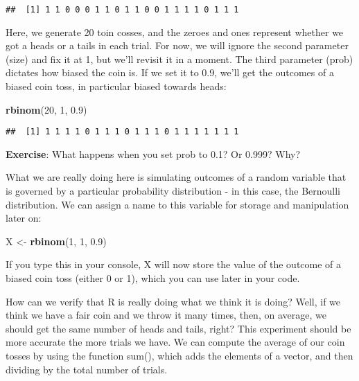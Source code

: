 \documentclass[
]{book}
\newenvironment{Shaded}{\begin{snugshade}}{\end{snugshade}}
\newcommand{\DecValTok}[1]{\textcolor[rgb]{0.00,0.00,0.81}{#1}}
\newcommand{\FloatTok}[1]{\textcolor[rgb]{0.00,0.00,0.81}{#1}}
\newcommand{\KeywordTok}[1]{\textcolor[rgb]{0.13,0.29,0.53}{\textbf{#1}}}
\newcommand{\NormalTok}[1]{#1}
\newcommand{\StringTok}[1]{\textcolor[rgb]{0.31,0.60,0.02}{#1}}
\begin{document}
\begin{verbatim}
##  [1] 1 1 0 0 0 1 1 0 1 1 0 0 1 1 1 1 0 1 1 1
\end{verbatim}

Here, we generate 20 toin cosses, and the zeroes and ones represent whether we got a heads or a tails in each trial. For now, we will ignore the second parameter (size) and fix it at 1, but we'll revisit it in a moment. The third parameter (prob) dictates how biased the coin is. If we set it to 0.9, we'll get the outcomes of a biased coin toss, in particular biased towards heads:

\begin{Shaded}
\begin{Highlighting}[]
\KeywordTok{rbinom}\NormalTok{(}\DecValTok{20}\NormalTok{, }\DecValTok{1}\NormalTok{, }\FloatTok{0.9}\NormalTok{)}
\end{Highlighting}
\end{Shaded}

\begin{verbatim}
##  [1] 1 1 1 1 0 1 1 1 0 1 1 1 0 1 1 1 1 1 1 1
\end{verbatim}

\textbf{Exercise}: What happens when you set prob to 0.1? Or 0.999? Why?

What we are really doing here is simulating outcomes of a random variable that is governed by a particular probability distribution - in this case, the Bernoulli distribution. We can assign a name to this variable for storage and manipulation later on:

\begin{Shaded}
\begin{Highlighting}[]
\NormalTok{X \textless{}{-}}\StringTok{ }\KeywordTok{rbinom}\NormalTok{(}\DecValTok{1}\NormalTok{, }\DecValTok{1}\NormalTok{, }\FloatTok{0.9}\NormalTok{)}
\end{Highlighting}
\end{Shaded}

If you type this in your console, X will now store the value of the outcome of a biased coin toss (either 0 or 1), which you can use later in your code.

How can we verify that R is really doing what we think it is doing? Well, if we think we have a fair coin and we throw it many times, then, on average, we should get the same number of heads and tails, right? This experiment should be more accurate the more trials we have. We can compute the average of our coin tosses by using the function sum(), which adds the elements of a vector, and then dividing by the total number of trials.
\end{document}
